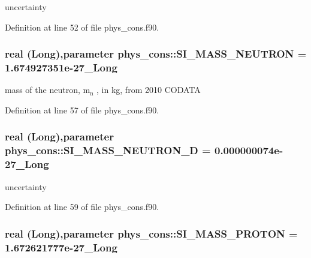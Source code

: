 uncertainty 



Definition at line 52 of file phys\_\-cons.f90.

\hypertarget{namespacephys__cons_ab117ad83bb79e4ed199d17f3c63ec4b3}{
\subsubsection[{SI\_\-MASS\_\-NEUTRON}]{\setlength{\rightskip}{0pt plus 5cm}real (Long),parameter {\bf phys\_\-cons::SI\_\-MASS\_\-NEUTRON} = 1.674927351e-\/27\_\-Long}}
\label{namespacephys__cons_ab117ad83bb79e4ed199d17f3c63ec4b3}


mass of the neutron, m$_{\mbox{n}}$ , in kg, from 2010 CODATA 



Definition at line 57 of file phys\_\-cons.f90.

\hypertarget{namespacephys__cons_af635c94d544c5bc6dcb05186a9f81d84}{
\subsubsection[{SI\_\-MASS\_\-NEUTRON\_\-D}]{\setlength{\rightskip}{0pt plus 5cm}real (Long),parameter {\bf phys\_\-cons::SI\_\-MASS\_\-NEUTRON\_\-D} = 0.000000074e-\/27\_\-Long}}
\label{namespacephys__cons_af635c94d544c5bc6dcb05186a9f81d84}


uncertainty 



Definition at line 59 of file phys\_\-cons.f90.

\hypertarget{namespacephys__cons_a6a740864089f117512dc89ea53f3dc5f}{
\subsubsection[{SI\_\-MASS\_\-PROTON}]{\setlength{\rightskip}{0pt plus 5cm}real (Long),parameter {\bf phys\_\-cons::SI\_\-MASS\_\-PROTON} = 1.672621777e-\/27\_\-Long}}
\label{namespacephys__cons_a6a740864089f117512dc89ea53f3dc5f}


